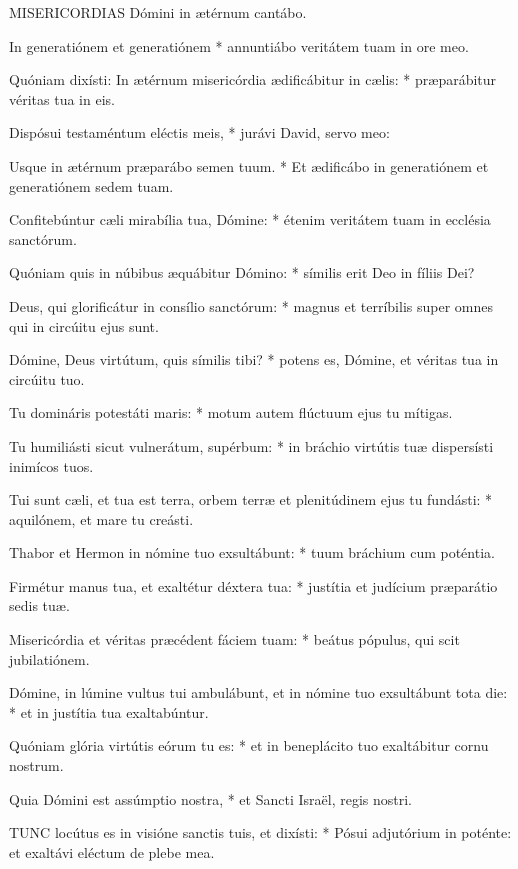 
\lettrine[lines=2]{M}{ISERICORDIAS} Dómini in ætérnum cantábo.

In generatiónem et generatiónem * annuntiábo veritátem tuam in ore meo.

Quóniam dixísti: In ætérnum misericórdia ædificábitur in cælis: * præparábitur véritas tua in eis.

Dispósui testaméntum eléctis meis, * jurávi David, servo meo:

Usque in ætérnum præparábo semen tuum. * Et ædificábo in generatiónem et generatiónem sedem tuam.

Confitebúntur cæli mirabília tua, Dómine: * étenim veritátem tuam in ecclésia sanctórum.

Quóniam quis in núbibus æquábitur Dómino: * símilis erit Deo in fíliis Dei?

Deus, qui glorificátur in consílio sanctórum: * magnus et terríbilis super omnes qui in circúitu ejus sunt.

Dómine, Deus virtútum, quis símilis tibi? * potens es, Dómine, et véritas tua in circúitu tuo.

Tu domináris potestáti maris: * motum autem flúctuum ejus tu mítigas.

Tu humiliásti sicut vulnerátum, supérbum: * in bráchio virtútis tuæ dispersísti inimícos tuos.

Tui sunt cæli, et tua est terra, orbem terræ et plenitúdinem ejus tu fundásti: * aquilónem, et mare tu creásti.

Thabor et Hermon in nómine tuo exsultábunt: * tuum bráchium cum poténtia.

Firmétur manus tua, et exaltétur déxtera tua: * justítia et judícium præparátio sedis tuæ.

Misericórdia et véritas præcédent fáciem tuam: * beátus pópulus, qui scit jubilatiónem.

Dómine, in lúmine vultus tui ambulábunt, et in nómine tuo exsultábunt tota die: * et in justítia tua exaltabúntur.

Quóniam glória virtútis eórum tu es: * et in beneplácito tuo exaltábitur cornu nostrum.

Quia Dómini est assúmptio nostra, * et Sancti Israël, regis nostri.


\lettrine[lines=2]{T}{UNC} locútus es in visióne sanctis tuis, et dixísti: * Pósui adjutórium in poténte: et exaltávi eléctum de plebe mea.

